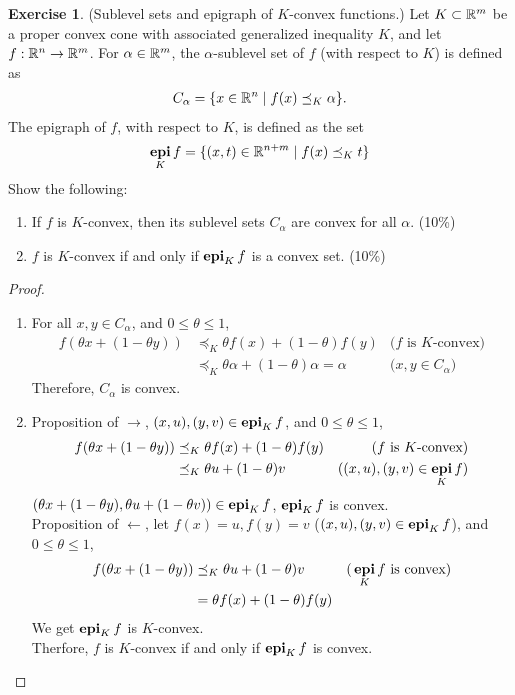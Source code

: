 \documentclass[12pt]{extarticle}
\theoremstyle{definition}
\newtheorem{exercise}{Exercise}
\begin{document}
\begin{exercise}
  (Sublevel sets and epigraph of $K$-convex functions.) Let $K\subset \mathbb{R}^m$ be a proper convex cone with associated generalized inequality $K$, and let $f:\mathbb{R}^n\rightarrow\mathbb{R}^m$.
  For $\alpha\in\mathbb{R}^m$, the $\alpha$-sublevel set of $f$ (with respect to $K$) is defined as
  \begin{align*}
    C_\alpha=\{x\in\mathbb{R}^n\mid f(x)\preceq_{K}\alpha\}.
  \end{align*}
  The epigraph of $f$, with respect to $K$, is defined as the set
  \begin{align*}
    \mathop{\bf epi}_Kf=\{(x,t)\in\mathbb{R}^{n+m}\mid f(x)\preceq_Kt\}
  \end{align*}
  Show the following:
  \begin{enumerate}[label=(\alph*)]
    \item If $f$ is $K$-convex, then its sublevel sets $C_\alpha$ are convex for all $\alpha$. (10\%) 
    \item $f$ is $K$-convex if and only if $\mathop{\bf epi}_Kf$ is a convex set. (10\%)
  \end{enumerate}
\end{exercise}
\begin{proof}
  $ $
  \begin{enumerate}[label=(\alph*)]
    \item For all $x, y\in C_\alpha$, and $0\le\theta\le 1$,
          \begin{align*}
            f(\theta x+(1-\theta y))
              & \preceq_K \theta f(x)+(1-\theta)f(y) & \text{(}f\text{ is }K\text{-convex)}\\
              & \preceq_K \theta \alpha+(1-\theta)\alpha = \alpha & \text{(}x, y\in C_\alpha\text{)}
          \end{align*}
          Therefore, $C_\alpha$ is convex.
    \item Proposition of $\rightarrow$, $(x,u),(y,v)\in\mathop{\bf epi}_Kf$, and $0\le\theta\le 1$,
          \begin{align*}
            f(\theta x+(1-\theta y))
              & \preceq_K \theta f(x)+(1-\theta)f(y) & \text{(}f\text{ is }K\text{-convex)}\\
              & \preceq_K \theta u+(1-\theta)v & \text{(}(x,u),(y,v)\in\mathop{\bf epi}_Kf\text{)}
          \end{align*}
          $(\theta x+(1-\theta y),\theta u+(1-\theta v))\in\mathop{\bf epi}_Kf$, \ie $\mathop{\bf epi}_Kf$ is convex.\\
          Proposition of $\leftarrow$, let $f(x)=u,f(y)=v$ ($(x,u),(y,v)\in\mathop{\bf epi}_Kf$), and $0\le\theta\le 1$,
          \begin{align*}
            f(\theta x+(1-\theta y))
              & \preceq_K \theta u+(1-\theta)v & \text{(}\mathop{\bf epi}_Kf\text{ is convex)}\\
              & = \theta f(x)+(1-\theta)f(y)
          \end{align*}
          We get $\mathop{\bf epi}_Kf$ is $K$-convex.\\
          Therfore, $f$ is $K$-convex if and only if $\mathop{\bf epi}_Kf$ is convex.\qedhere
  \end{enumerate}
\end{proof}
\end{document}
